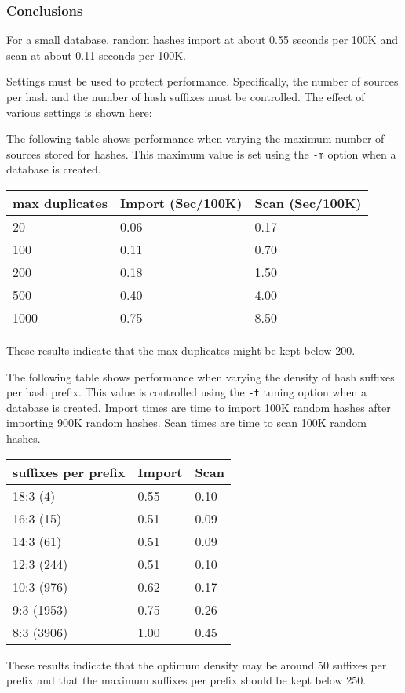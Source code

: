 \documentclass[12pt,twoside]{article}
\begin{document}
\subsubsection*{Conclusions}
\begin{compactitem}
\item For a small database, random hashes import at about 0.55 seconds
per 100K and scan at about 0.11 seconds per 100K.
\item Settings must be used to protect performance.
Specifically, the number of sources per hash and the number of hash suffixes
must be controlled.
The effect of various settings is shown here:

\begin{compactitem}
\item The following table shows performance when varying the maximum number of
sources stored for hashes.
This maximum value is set using the \verb+-m+ option when a database is created.

\vspace{4mm}
\begin{tabular}{|l|l|l|}
\hline
max duplicates & Import (Sec/100K) & Scan (Sec/100K) \\
\hline
20 & 0.06 & 0.17 \\
100 & 0.11 & 0.70 \\
200 & 0.18 & 1.50 \\
500 & 0.40 & 4.00 \\
1000 & 0.75 & 8.50 \\
\hline
\end{tabular}
\vspace{4mm}

These results indicate that the max duplicates might be kept below 200.

\item The following table shows performance when varying the density of
hash suffixes per hash prefix.
This value is controlled using the \verb+-t+ tuning option
when a database is created.
Import times are time to import 100K random hashes
after importing 900K random hashes.
Scan times are time to scan 100K random hashes.

\vspace{4mm}
\begin{tabular}{|l|l|l|}
\hline
suffixes per prefix & Import & Scan \\
\hline
18:3 (4) & 0.55 & 0.10 \\
16:3 (15) & 0.51 & 0.09 \\
14:3 (61) & 0.51 & 0.09 \\
12:3 (244) & 0.51 & 0.10 \\
10:3 (976) & 0.62 & 0.17 \\
9:3 (1953) & 0.75 & 0.26 \\
8:3 (3906) & 1.00 & 0.45 \\
\hline
\end{tabular}
\vspace{4mm}

These results indicate that the optimum density may be around 50
suffixes per prefix and that the maximum suffixes per prefix
should be kept below 250.

\end{compactitem}

\end{compactitem}
\end{document}
